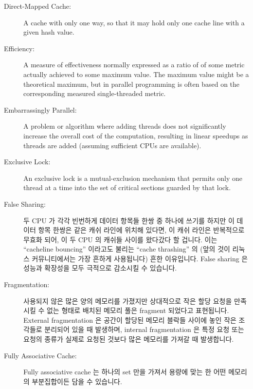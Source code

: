 \begin{description}
\item[Direct-Mapped Cache:]
	A cache with only one way, so that it may hold only one cache
	line with a given hash value.
\item[Efficiency:]
	A measure of effectiveness normally expressed as a ratio of
	of some metric actually achieved to some maximum value.
	The maximum value might be a theoretical maximum, but in
	parallel programming is often based on the corresponding
	measured single-threaded metric.
\item[Embarrassingly Parallel:]
	A problem or algorithm where adding threads does not significantly
	increase the overall cost of the computation, resulting in
	linear speedups as threads are added (assuming sufficient
	CPUs are available).
\item[Exclusive Lock:]
	An exclusive lock is a mutual-exclusion mechanism that
	permits only one thread at a time into the
	set of critical sections guarded by that lock.

\fi

\item[False Sharing:]
	두 CPU 가 각각 빈번하게 데이터 항목들 한쌍 중 하나에 쓰기를 하지만 이
	데이터 항목 한쌍은 같은 캐쉬 라인에 위치해 있다면, 이 캐쉬 라인은
	반복적으로 무효화 되어, 이 두 CPU 의 캐쉬들 사이를 왔다갔다 할 겁니다.
	이는 ``cacheline bouncing'' 이라고도 불리는 ``cache thrashing'' 의
	(앞의 것이 리눅스 커뮤니티에서는 가장 흔하게 사용됩니다) 흔한
	이유입니다.
	False sharing 은 성능과 확장성을 모두 극적으로 감소시킬 수 있습니다.
\item[Fragmentation:]
	사용되지 않은 많은 양의 메모리를 가졌지만 상대적으로 작은 할당 요청을
	만족시킬 수 없는 형태로 배치된 메모리 풀은 fragment 되었다고
	표현됩니다.
	External fragmentation 은 공간이 할당된 메모리 블락들 사이에 놓인 작은
	조각들로 분리되어 있을 때 발생하며, internal fragmentation 은 특정 요청
	또는 요청의 종류가 실제로 요청된 것보다 많은 메모리를 가져갈 때
	발생합니다.
\item[Fully Associative Cache:]
	Fully associative cache 는 하나의 set 만을 가져서 용량에 맞는 한 어떤
	메모리의 부분집합이든 담을 수 있습니다.

\iffalse


\end{description}

